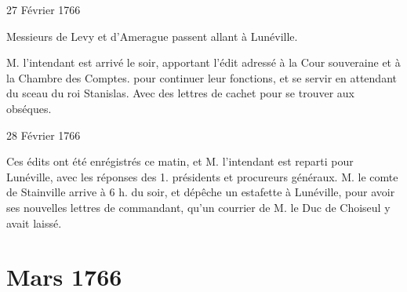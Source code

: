                      \begin{diary}{27 Février 1766}{}
                        
                        
                           Messieurs
                           de Levy et d'Amerague passent allant
                           à Lunéville. \bigskip
        
        
                        
                           M. l'intendant est arrivé le
                           soir, apportant
                           l'édit adressé à la Cour souveraine et à la Chambre des Comptes.
                           pour continuer leur fonctions, et se servir en
                           attendant du sceau du roi
                              Stanislas. Avec des
                           lettres de cachet pour se
                           trouver aux obséques. \bigskip
        
        
                     \end{diary}
                     \begin{diary}{28 Février 1766}{}
                        
                         Ces édits ont été enrégistrés ce
                           matin, et M.
                              l'intendant est reparti pour Lunéville, avec les
                           réponses des 1. présidents et procureurs généraux.
                           M. le comte de Stainville
                           arrive à 6 h. du
                           soir, et dépêche un estafette à Lunéville, pour
                           avoir ses nouvelles lettres de commandant, qu'un
                           courrier de M. le Duc de
                              Choiseul y avait
                           laissé. \bigskip
        
        
                     \end{diary}
                  \chapter*{Mars 1766}
                     
